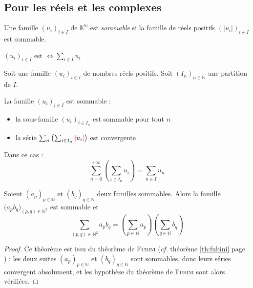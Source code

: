 \documentclass[11pt,a4paper,fleqn,pdftex]{report}
\begin{document}
\subsection{Pour les réels et les complexes} %
\label{sub:famille_sommable_complexe_reel}
\begin{dfn}
     Une famille $(u_i)_{i\in I}$ de $\mathbb{K}^\mathbb{N}$ est \emph{sommable} si la famille de réels positifs $(|u_i|)_{i\in I}$ est sommable.
\end{dfn}
\begin{theorem}
     $(u_i)_{i\in I}$ est  $\Leftrightarrow \sum_{i\in I} u_i$ 
\end{theorem}
\begin{itheorem}
     Soit une famille $(u_i)_{i\in I}$ de nombres réels positifs.\newline
     Soit $(I_n)_{n\in\mathbb{N}}$ une partition  de $I$.\par
     La famille $(u_i)_{i\in I}$ est sommable  :
     \begin{itemize}
         \item la sous-famille $(u_i)_{i\in I_n}$ est sommable pour tout $n$
         \item la série $\sum_n \left( \sum_{i\in I_n} \textcolor{couleurImp}{|}u_i \textcolor{couleurImp}{|} \right)$ est convergente
     \end{itemize}
     Dans ce cas : 
     \begin{equation}
     \sum_{n=0}^{+\infty} \left( \sum_{i\in I_n} u_i \right) = \sum_{n\in I} u_n
     \end{equation}
\end{itheorem}
\begin{theorem}
     Soient $(a_p)_{p\in \mathbb{N}}$ et $(b_q)_{q\in \mathbb{N}}$ deux familles sommables. Alors la famille $\big( a_p b_q\big)_{(p,q)\in \mathbb{N}^2}$ est sommable et 
     \begin{equation}
     \sum_{(p,q)\in \mathbb{N}^2} a_p b_q= \left( \sum_{p\in \mathbb{N}} a_p \right) \left( \sum_{q\in \mathbb{N}} b_q \right)
     \end{equation}
\end{theorem}
\begin{proof}
     Ce théorème est issu du théorème de \textsc{Fubini} (\textit{cf.} théorème \ref{th:fubini} page \pageref{th:fubini}) : les deux suites $(a_p)_{p\in \mathbb{N}}$ et $(b_q)_{q\in \mathbb{N}}$ sont sommables, donc leurs séries convergent absolument, et les hypothèse du théorème de \textsc{Fubini} sont alors vérifiées.
\end{proof}
\end{document}
